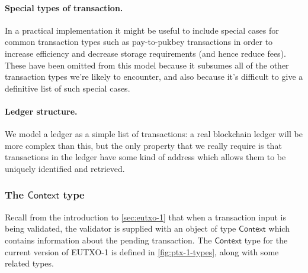 \documentclass[a4paper]{article}
\newcommand{\s}{\textsf}  %
\newcommand{\ctx}{\ensuremath{\s{Context}}}
\begin{document}
\paragraph{Special types of transaction.} In a practical
implementation it might be useful to include special cases for common
transaction types such as pay-to-pukbey transactions in order to
increase efficiency and decrease storage requirements (and hence
reduce fees).  These have been omitted from this model because it
subsumes all of the other transaction types we're likely to encounter,
and also because it's difficult to give a definitive list of such
special cases.

\paragraph{Ledger structure.} We model a ledger as a simple
list of transactions: a real blockchain ledger will be more complex
than this, but the only property that we really require is that
transactions in the ledger have some kind of address which allows them
to be uniquely identified and retrieved.

\subsubsection{The \ctx{} type}
\label{sec:context}
Recall from the introduction to \cref{sec:eutxo-1} that when a
transaction input is being validated, the validator is supplied
with an object of type \ctx{} which contains information about the
pending transaction.  The \ctx{} type for the current version of
EUTXO-1 is defined in \cref{fig:ptx-1-types}, along with some
related types.
\end{document}
